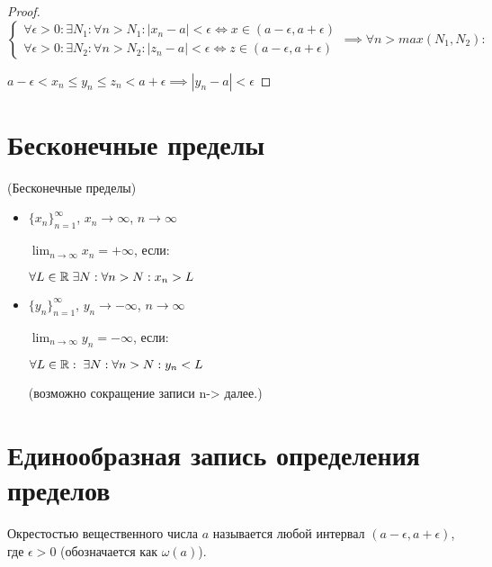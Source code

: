 \begin{proof}
    $\begin{cases}
        \forall \epsilon > 0: \exists N_1: \forall n > N_1: |x_n - a| < \epsilon \Leftrightarrow x \in (a - \epsilon, a + \epsilon) \\
        \forall \epsilon > 0: \exists N_2: \forall n > N_2: |z_n - a| < \epsilon \Leftrightarrow z \in (a - \epsilon, a + \epsilon)
    \end{cases} \implies \forall n > max(N_1, N_2):$

    $a - \epsilon < x_n \leq y_n \leq z_n < a + \epsilon \implies |y_n - a| < \epsilon$
    
\end{proof}

\section{Бесконечные пределы}

\begin{definition} (Бесконечные пределы)
    \begin{itemize}
        \item $\{x_n\}_{n=1}^{\infty}$, $x_n \to \infty$, $n \to \infty$

        $\lim_{n \to \infty} x_n = + \infty$, если:

        $\forall L \in \mathbb{R} \; \exists N: \forall n > N: x_n > L$

        \item $\{y_n\}_{n=1}^\infty$, $y_n \to -\infty$, $n \to \infty$

        $\lim_{n \to \infty} y_n = -\infty$, если:

        $\forall L \in \mathbb{R}: \; \exists N: \forall n > N: y_n < L$


    (возможно сокращение записи n-> далее.)
    \end{itemize}
\end{definition}

\section{Единообразная запись определения пределов}

\begin{definition}
    Окрестостью вещественного числа $a$ называется любой интервал $(a - \epsilon, a + \epsilon)$, где $\epsilon > 0$ (обозначается как $\omega(a)$).
\end{definition}

